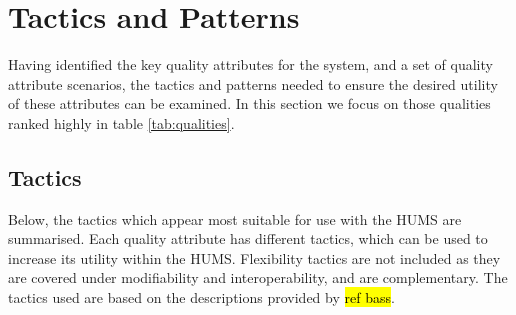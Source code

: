 \documentclass[10pt,a4paper]{article}
\begin{document}
\section{Tactics and Patterns}
\label{sec:tactics}
Having identified the key quality attributes for the system, and a set of quality attribute scenarios, the tactics and patterns needed to ensure the desired utility of these attributes can be examined. In this section we focus on those qualities ranked highly in table \ref{tab:qualities}.

\subsection{Tactics}

Below, the tactics which appear most suitable for use with the HUMS are summarised. Each quality attribute has different tactics, which can be used to increase its utility within the HUMS. Flexibility tactics are not included as they are covered under modifiability and interoperability, and are complementary. The tactics used are based on the descriptions provided by \hl{ref bass}.
\end{document}
